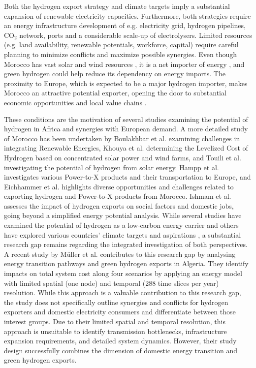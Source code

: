 Both the hydrogen export strategy and climate targets imply a substantial expansion of renewable electricity capacities. Furthermore, both strategies require an energy infrastructure development of e.g. electricity grid, hydrogen pipelines, $\mathrm{CO_2}$ network, ports and a considerable scale-up of electrolysers.
Limited resources (e.g. land availability, renewable potentials, workforce, capital) require careful planning to minimize conflicts and maximize possible synergies. Even though Morocco has vast solar and wind resources \cite{Peters2023, Touili2018, Sterl2022}, it is a net importer of energy \cite{IEA2022}, and green hydrogen could help reduce its dependency on energy imports. The proximity to Europe, which is expected to be a major hydrogen importer, makes Morocco an attractive potential exporter, opening the door to substantial economic opportunities and local value chains \cite{Ersoy2022}.


These conditions are the motivation of several studies \cite{vanWijk2021, AbouSeada2022, vanderZwaan2021, Schellekens2010, Cavana2021, Touili2022, Timmerberg2019, Sens2022, Franzmann2023} examining the potential of hydrogen in Africa and synergies with European demand. A more detailed study of Morocco has been undertaken by Boulakhbar et al.\cite{Boulakhbar2020} examining challenges in integrating Renewable Energies, Khouya et al.\cite{Khouya2020} determining the Levelized Cost of Hydrogen based on concentrated solar power and wind farms, and Touili et al.\cite{Touili2018} investigating the potential of hydrogen from solar energy. Hampp et al.\cite{Hampp2023} investigates various Power-to-X products and their transportation to Europe, and Eichhammer et al. \cite{Eichhammer2019} highlights diverse opportunities and challenges related to exporting hydrogen and Power-to-X products from Morocco. Ishmam et al. \cite{Ishmam2024} assesses the impact of hydrogen exports on social factors and domestic jobs, going beyond a simplified energy potential analysis.
While several studies \cite{Hampp2023, AbouSeada2022, vanWijk2021} have examined the potential of hydrogen as a low-carbon energy carrier and others have explored various countries' climate targets and aspirations \cite{Boulakhbar2020}, a substantial research gap remains regarding the integrated investigation of both perspectives. 
A recent study by Müller et al.\cite{Muller2024} contributes to this research gap by analysing energy transition pathways and green hydrogen exports in Algeria. They identify impacts on total system cost along four scenarios by applying an energy model with limited spatial (one node) and temporal (288 time slices per year) resolution. While this approach is a valuable contribution to this research gap, the study does not specifically outline synergies and conflicts for hydrogen exporters and domestic electricity consumers and differentiate between those interest groups. 
Due to their limited spatial and temporal resolution, this approach is unsuitable to identify transmission bottlenecks, infrastructure expansion requirements, and detailed system dynamics. However, their study design successfully combines the dimension of domestic energy transition and green hydrogen exports.


